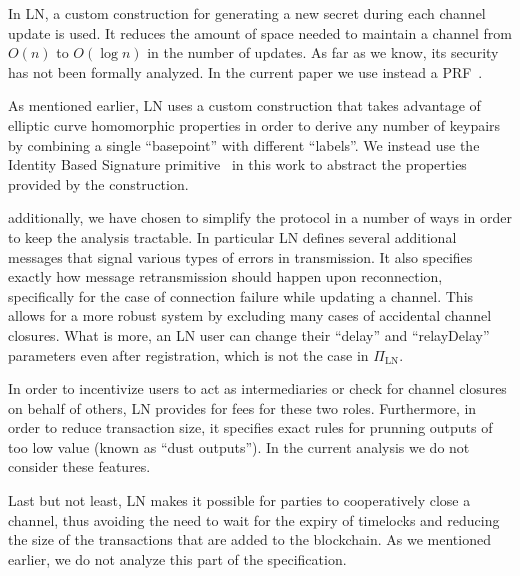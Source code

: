   \begin{remark}

    In LN, a custom construction for generating a new secret during each channel
    update is used. It reduces the amount of space needed to maintain a channel
    from $O(n)$ to $O(\log n)$ in the number of updates. As far as we know, its
    security has not been formally analyzed. In the current paper we use instead
    a PRF~\cite{katzlindell}.

    As mentioned earlier, LN uses a custom construction that takes advantage of
    elliptic curve homomorphic properties in order to derive any number of
    keypairs by combining a single ``basepoint'' with different ``labels''. We
    instead use the Identity Based Signature
    primitive~\cite{ibsshamir,ibspaterson} in this work to abstract the
    properties provided by the construction.

    additionally, we have chosen to simplify the protocol in a number of ways in
    order to keep the analysis tractable. In particular LN defines several
    additional messages that signal various types of errors in transmission. It
    also specifies exactly how message retransmission should happen upon
    reconnection, specifically for the case of connection failure while updating
    a channel. This allows for a more robust system by excluding many cases of
    accidental channel closures. What is more, an LN user can change their
    ``delay'' and ``relayDelay'' parameters even after registration, which is
    not the case in $\Pi_{\mathrm{LN}}$.

    In order to incentivize users to act as intermediaries or check for channel
    closures on behalf of others, LN provides for fees for these two roles.
    Furthermore, in order to reduce transaction size, it specifies exact rules
    for prunning outputs of too low value (known as ``dust outputs''). In the
    current analysis we do not consider these features.

    Last but not least, LN makes it possible for parties to cooperatively close
    a channel, thus avoiding the need to wait for the expiry of timelocks and
    reducing the size of the transactions that are added to the blockchain. As
    we mentioned earlier, we do not analyze this part of the specification.
  \end{remark}
